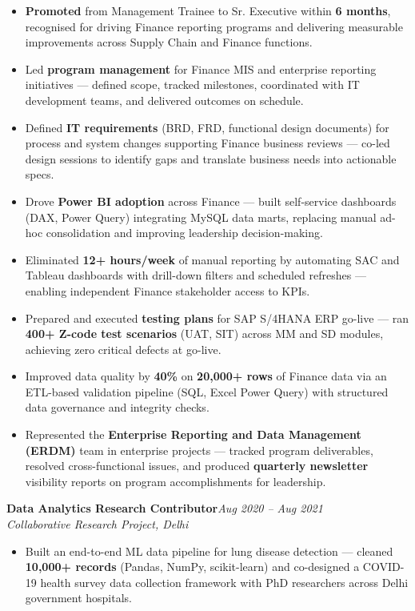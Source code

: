 \documentclass[10pt, letterpaper]{article}
\newcommand{\role}[3]{%
  \vspace{2pt}%
  {\bfseries #1}\hfill{\small\color{muted}\textit{#3}}\\[-2pt]%
  {\small\color{muted}\textit{#2}}%
}
\begin{document}
\begin{itemize}
  \item \textbf{Promoted} from Management Trainee to Sr. Executive within \textbf{6 months}, recognised for driving Finance reporting programs and delivering measurable improvements across Supply Chain and Finance functions.
  \item Led \textbf{program management} for Finance MIS and enterprise reporting initiatives — defined scope, tracked milestones, coordinated with IT development teams, and delivered outcomes on schedule.
  \item Defined \textbf{IT requirements} (BRD, FRD, functional design documents) for process and system changes supporting Finance business reviews — co-led design sessions to identify gaps and translate business needs into actionable specs.
  \item Drove \textbf{Power BI adoption} across Finance — built self-service dashboards (DAX, Power Query) integrating MySQL data marts, replacing manual ad-hoc consolidation and improving leadership decision-making.
  \item Eliminated \textbf{12+ hours/week} of manual reporting by automating SAC and Tableau dashboards with drill-down filters and scheduled refreshes — enabling independent Finance stakeholder access to KPIs.
  \item Prepared and executed \textbf{testing plans} for SAP S/4HANA ERP go-live — ran \textbf{400+ Z-code test scenarios} (UAT, SIT) across MM and SD modules, achieving zero critical defects at go-live.
  \item Improved data quality by \textbf{40\%} on \textbf{20,000+ rows} of Finance data via an ETL-based validation pipeline (SQL, Excel Power Query) with structured data governance and integrity checks.
  \item Represented the \textbf{Enterprise Reporting and Data Management (ERDM)} team in enterprise projects — tracked program deliverables, resolved cross-functional issues, and produced \textbf{quarterly newsletter} visibility reports on program accomplishments for leadership.
\end{itemize}

\vspace{1pt}

\role{Data Analytics Research Contributor}{Collaborative Research Project, Delhi}{Aug 2020 – Aug 2021}

\begin{itemize}
  \item Built an end-to-end ML data pipeline for lung disease detection — cleaned \textbf{10,000+ records} (Pandas, NumPy, scikit-learn) and co-designed a COVID-19 health survey data collection framework with PhD researchers across Delhi government hospitals.
\end{itemize}
\end{document}
